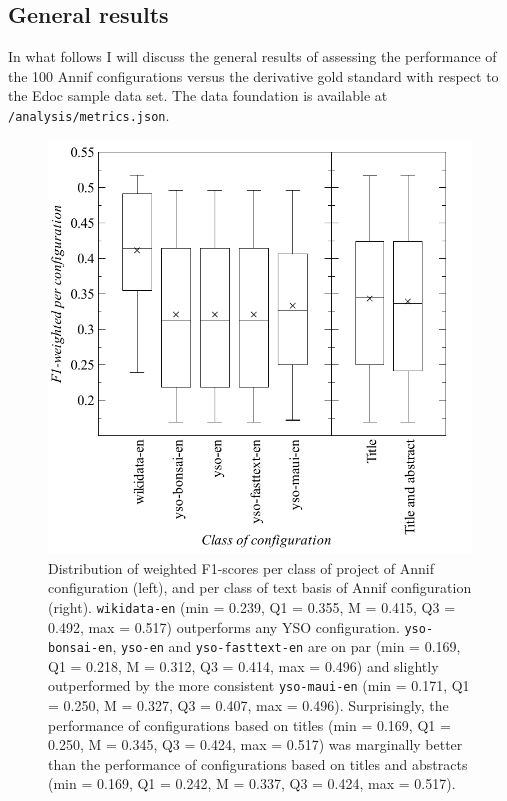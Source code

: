 \hypertarget{general-results}{%
\subsection{General results}\label{general-results}}

In what follows I will discuss the general results of assessing the
performance of the 100 Annif configurations versus the derivative gold
standard with respect to the Edoc sample data set. The data foundation
is available at \texttt{/analysis/metrics.json}.

\begin{figure}
\centering
\includegraphics{images/metrics_all_project+abstract.pdf}
\caption{Distribution of weighted F1-scores per class of project of
Annif configuration (left), and per class of text basis of Annif
configuration (right). \texttt{wikidata-en} (min = 0.239, Q1 = 0.355, M
= 0.415, Q3 = 0.492, max = 0.517) outperforms any YSO configuration.
\texttt{yso-bonsai-en}, \texttt{yso-en} and \texttt{yso-fasttext-en} are
on par (min = 0.169, Q1 = 0.218, M = 0.312, Q3 = 0.414, max = 0.496) and
slightly outperformed by the more consistent \texttt{yso-maui-en} (min =
0.171, Q1 = 0.250, M = 0.327, Q3 = 0.407, max = 0.496). Surprisingly,
the performance of configurations based on titles (min = 0.169, Q1 =
0.250, M = 0.345, Q3 = 0.424, max = 0.517) was marginally better than
the performance of configurations based on titles and abstracts (min =
0.169, Q1 = 0.242, M = 0.337, Q3 = 0.424, max = 0.517).}
\end{figure}

